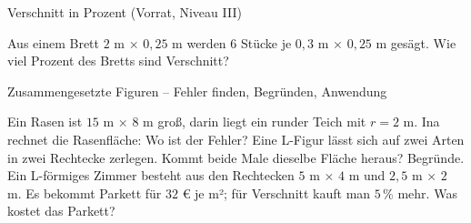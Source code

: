 \begin{aufgabe}{Verschnitt in Prozent (Vorrat, Niveau III)}
\begin{teile}
\teil Aus einem Brett $2$ m × $0{,}25$ m werden $6$ Stücke je $0{,}3$ m × $0{,}25$ m gesägt. Wie viel Prozent des Bretts sind Verschnitt?
\end{teile}
\end{aufgabe}

\begin{aufgabe}{Zusammengesetzte Figuren – Fehler finden, Begründen, Anwendung}
\begin{teile}
\teil Ein Rasen ist $15$ m × $8$ m groß, darin liegt ein runder Teich mit $r = 2$ m. Ina rechnet die Rasenfläche:  Wo ist der Fehler?
\teil Eine L-Figur lässt sich auf zwei Arten in zwei Rechtecke zerlegen. Kommt beide Male dieselbe Fläche heraus? Begründe.
\teil Ein L-förmiges Zimmer besteht aus den Rechtecken $5$ m × $4$ m und $2{,}5$ m × $2$ m. Es bekommt Parkett für $32$ € je m²; für Verschnitt kauft man $5\,\%$ mehr. Was kostet das Parkett?
\end{teile}
\end{aufgabe}
